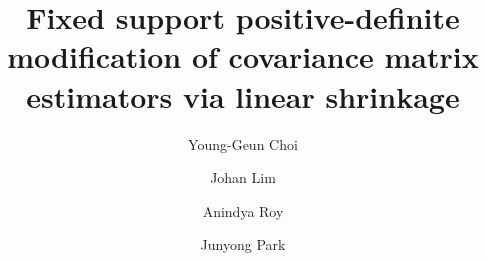 \documentclass[times,sort&compress,3p]{elsarticle}
\begin{document}
\begin{frontmatter}

\title{Fixed support positive-definite modification of covariance matrix estimators
via linear shrinkage}


\author[SKT]{Young-Geun Choi}
\author[SNU]{Johan Lim}
\author[UMBC]{Anindya Roy} 
\author[UMBC]{Junyong Park} 

\address[SKT]{Data R\&D Center, SK Telecom, 65 Eulji-ro, Jung-Gu, Seoul 04539, Rep. of Korea}
\address[SNU]{Department of Statistics, Seoul National University, 1 Gwanak-ro, Gwanak-gu, Seoul 08826, Rep. of Korea}
\address[UMBC]{Department of Mathematics and Statistics, University of Maryland Baltimore County, 1100 Hilltop Circle, Baltimore, MD 21250, United States}







%
%
%


\end{frontmatter}
\end{document}

